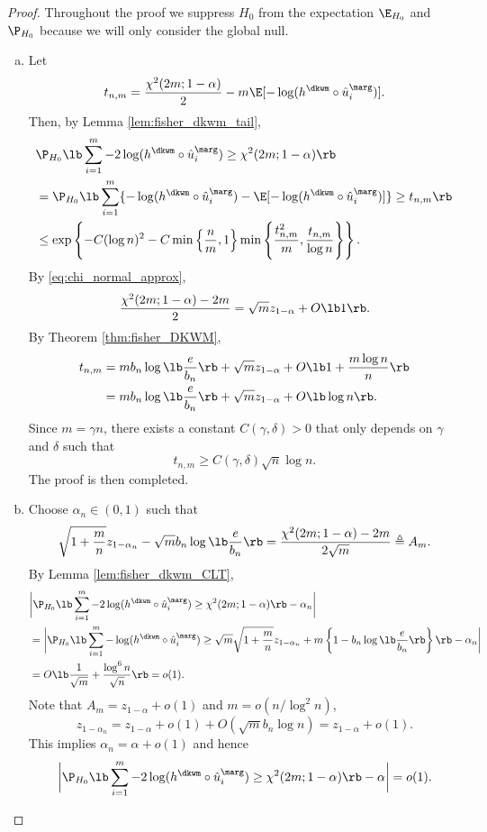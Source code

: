 \begin{proof}
Throughout the proof we suppress $H_0$ from the expectation $\E_{H_0}$ and $\P_{H_0}$ because we will only consider the global null.
  \begin{enumerate}[(a)]
  \item Let
    \[t_{n, m} = \frac{\chi^2(2m; 1 - \alpha)}{2} - m\E[-\log(h^\dkwm \circ \hat{u}_i^\marg)].\]
    Then, by Lemma \ref{lem:fisher_dkwm_tail},
    \begin{align*}
      &\P_{H_0}\lb \sum_{i=1}^{m} -2\log(h^\dkwm \circ \hat{u}_i^\marg)\ge \chi^2(2m; 1 - \alpha)\rb\\
      & = \P_{H_0}\lb \sum_{i=1}^{m} \{-\log(h^\dkwm \circ \hat{u}_i^\marg) - \E[-\log(h^\dkwm \circ \hat{u}_i^\marg)]\}\ge t_{n, m}\rb\\
      & \le \exp\left\{-C(\log n)^2 - C\min\left\{\frac{n}{m}, 1\right\}\min\left\{\frac{t_{n,m}^2}{m}, \frac{t_{n,m}}{\log n}\right\}\right\}.
    \end{align*}
    By \eqref{eq:chi_normal_approx},
    \[\frac{\chi^2(2m; 1 - \alpha) - 2m}{2} = \sqrt{m}z_{1-\alpha} + O\lb 1\rb.\]
    By Theorem \ref{thm:fisher_DKWM},
    \begin{align*}
      t_{n, m} &= mb_{n}\log\lb \frac{e}{b_n}\rb + \sqrt{m}z_{1-\alpha} + O\lb 1 + \frac{m\log n}{n}\rb\\
               & = mb_{n}\log\lb \frac{e}{b_n}\rb + \sqrt{m}z_{1-\alpha} + O\lb\log n\rb.
    \end{align*}
    Since $m = \gamma n$, there exists a constant $C(\gamma, \delta) > 0$ that only depends on $\gamma$ and $\delta$ such that
    \[t_{n, m}\ge C(\gamma, \delta)\sqrt{n}\log n.\]
    The proof is then completed.
  \item Choose $\alpha_n\in (0, 1)$ such that
    \[\sqrt{1 + \frac{m}{n}}z_{1 - \alpha_{n}} - \sqrt{m}b_n\log\lb\frac{e}{b_n}\rb = \frac{\chi^2(2m; 1 - \alpha) - 2m}{2\sqrt{m}} \triangleq A_m.\]
    By Lemma \ref{lem:fisher_dkwm_CLT},
    \begin{align*}
      &\bigg|\P_{H_0}\lb\sum_{i=1}^{m} -2\log(h^\dkwm \circ \hat{u}_i^\marg)\ge \chi^2(2m; 1 - \alpha)\rb - \alpha_n\bigg|\\
      & = \bigg|\P_{H_0}\lb\sum_{i=1}^{m} -\log(h^\dkwm \circ \hat{u}_i^\marg)\ge \sqrt{m}\sqrt{1 + \frac{m}{n}}z_{1- \alpha_n} + m \left\{ 1 - b_n\log\lb\frac{e}{b_n}\rb\right\}\rb - \alpha_n\bigg|\\
      & = O\lb \frac{1}{\sqrt{m}} + \frac{\log^6 n}{\sqrt{n}}\rb = o(1).
    \end{align*}
    Note that $A_{m} = z_{1-\alpha} + o(1)$ and $m = o(n / \log^2 n)$,
    \[z_{1-\alpha_n} = z_{1- \alpha} + o(1) + O(\sqrt{m} b_n\log n) = z_{1 - \alpha} + o(1).\]
    This implies $\alpha_n = \alpha + o(1)$ and hence
    \[\bigg|\P_{H_0}\lb\sum_{i=1}^{m} -2\log(h^\dkwm \circ \hat{u}_i^\marg)\ge \chi^2(2m; 1 - \alpha)\rb - \alpha\bigg| = o(1).\]
  \end{enumerate}
\end{proof}


